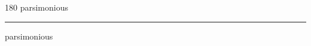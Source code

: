 
\begin{frame}
\begin{center}
\begin{turn}{180}
{\fontsize{2.5cm}{1em}\selectfont parsimonious}
\end{turn}
\vspace{1em}\par  
\hrule
\vspace{1em}\par  
{\fontsize{2.5cm}{1em}\selectfont parsimonious}
\end{center}
\end{frame}

